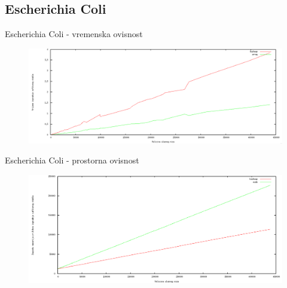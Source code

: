\documentclass[utf8]{beamer}
\begin{document}
\subsection{Escherichia Coli}
\begin{frame}{Escherichia Coli - vremenska ovisnost}
\begin{figure}[h!]	
	\centering
	\includegraphics[width=\textwidth]{media/time_1.png}
\end{figure}

\end{frame}
\begin{frame}{Escherichia Coli - prostorna ovisnost}

\begin{figure}[h!]	
	\centering
	\includegraphics[width=1\textwidth]{media/memory_1.png}
\end{figure}

\end{frame}
\end{document}
